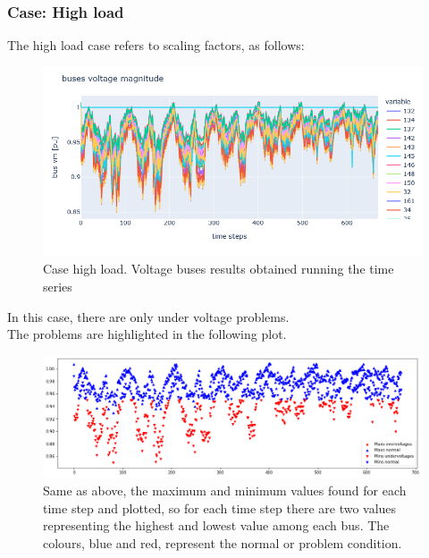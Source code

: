 \newpage
\subsubsection{Case: High load}
The high load case refers to scaling factors, as follows:
\begin{algorithm}[h]
    
\end{algorithm}

\begin{figure}[h]
\centering
    \includegraphics[width=.7\linewidth]{images/MVOberr/High load.png}
\caption{Case high load. Voltage buses results obtained running the time series}
\label{fig:gym_anm_net}
\end{figure}

In this case, there are only under voltage problems. \\
The problems are highlighted in the following plot.

\begin{figure}[h]
\centering
    \includegraphics[width=.8\linewidth]{images/MVOberr/High load problems.png}
    \caption{Same as above, the maximum and minimum values found for each time step and plotted, so for each time step there are two values representing the highest and lowest value among each bus. The colours, blue and red, represent the normal or problem condition.}
\end{figure}